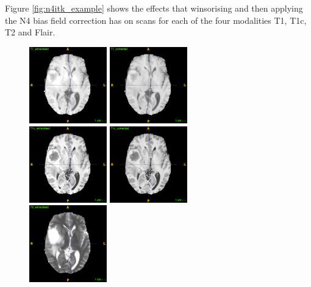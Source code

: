 \documentclass[12pt,a4paper,twoside,openright]{report}
\begin{document}
Figure \ref{fig:n4itk_example} shows the effects that winsorising and then applying the N4 bias field correction has on scans for each of the four modalities T1, T1c, T2 and Flair.
\begin{figure}
	\centering
	\includegraphics[width=0.3\textwidth]{t1_winsorized_example}
	\includegraphics[width=0.3\textwidth]{t1_n4itk_example} \\
	\vspace{0.5cm}
	\includegraphics[width=0.3\textwidth]{t1c_winsorized_example}
	\includegraphics[width=0.3\textwidth]{t1c_n4itk_example} \\
	\vspace{0.5cm}
	\includegraphics[width=0.3\textwidth]{t2_winsorized_example}

\end{figure}
\end{document}
